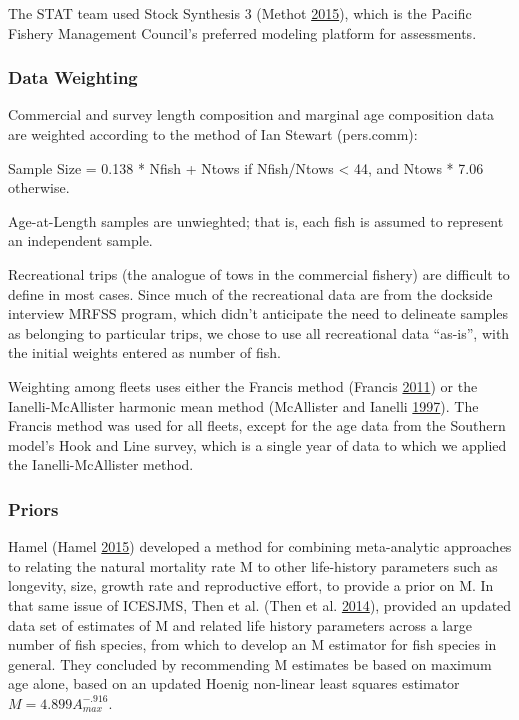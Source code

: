 \documentclass[12pt,]{article}
\begin{document}
The STAT team used Stock Synthesis 3 (Methot
\protect\hyperlink{ref-Methot2015}{2015}), which is the Pacific Fishery
Management Council's preferred modeling platform for assessments.

\subsubsection{Data Weighting}\label{data-weighting}

Commercial and survey length composition and marginal age composition
data are weighted according to the method of Ian Stewart (pers.comm):

Sample Size = 0.138 * Nfish + Ntows if Nfish/Ntows \textless{} 44, and
Ntows * 7.06 otherwise.

Age-at-Length samples are unwieghted; that is, each fish is assumed to
represent an independent sample.

Recreational trips (the analogue of tows in the commercial fishery) are
difficult to define in most cases. Since much of the recreational data
are from the dockside interview MRFSS program, which didn't anticipate
the need to delineate samples as belonging to particular trips, we chose
to use all recreational data ``as-is'', with the initial weights entered
as number of fish.

Weighting among fleets uses either the Francis method (Francis
\protect\hyperlink{ref-Francis2011}{2011}) or the Ianelli-McAllister
harmonic mean method (McAllister and Ianelli
\protect\hyperlink{ref-McAllister1997}{1997}). The Francis method was
used for all fleets, except for the age data from the Southern model's
Hook and Line survey, which is a single year of data to which we applied
the Ianelli-McAllister method.

\subsubsection{\texorpdfstring{Priors
\label{priors}}{Priors }}\label{priors}

Hamel (Hamel \protect\hyperlink{ref-Hamel2015}{2015}) developed a method
for combining meta-analytic approaches to relating the natural mortality
rate M to other life-history parameters such as longevity, size, growth
rate and reproductive effort, to provide a prior on M. In that same
issue of ICESJMS, Then et al. (Then et al.
\protect\hyperlink{ref-Then2014}{2014}), provided an updated data set of
estimates of M and related life history parameters across a large number
of fish species, from which to develop an M estimator for fish species
in general. They concluded by recommending M estimates be based on
maximum age alone, based on an updated Hoenig non-linear least squares
estimator \(M=4.899A_{max }^{-.916}\).
\end{document}
